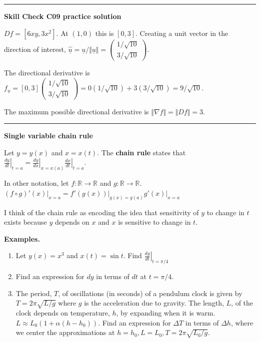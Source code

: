 \documentclass[12pt,letterpaper,noanswers]{exam}
\newcommand{\mb}[1]{\underline{#1}}
\begin{document}
\vspace{0.2cm}
\hrule
\vspace{0.2cm}

\noindent\textbf{Skill Check C09 practice solution}

$Df = [6xy, 3x^2]$.  At $(1,0)$ this is $[0, 3]$.  Creating a unit vector in the direction of interest, $\hat{\mb{u}}=\mb{u}/\Vert\mb{u}\Vert = \left(\begin{array}{c} 1/\sqrt{10} \\ 3/\sqrt{10}\end{array}\right)$.

The directional derivative is $f_{\mb{u}} =[0, 3]\left(\begin{array}{c} 1/\sqrt{10} \\ 3/\sqrt{10}\end{array}\right) = 0(1/\sqrt{10}) + 3(3/\sqrt{10}) = 9/\sqrt{10}$.

The maximum possible directional derivative is $\Vert \nabla f \Vert = \Vert Df \Vert = 3.$

\vspace{0.2cm}
\hrule
\vspace{0.2cm}



\noindent\textbf{Single variable chain rule}
\begin{tcolorbox}
Let $y = y(x)$ and $x = x(t)$.  The \textbf{chain rule} states that $\left.\frac{dy}{dt}\right\vert_{t=a} = \left.\frac{dy}{dx}\right\vert_{x=x(a)}\left.\frac{dx}{dt}\right\vert_{t=a}.$

In other notation, let $f:\mathbb{R}\rightarrow\mathbb{R}$ and $g:\mathbb{R}\rightarrow\mathbb{R}$.  $\left.(f\circ g)'(x)\right\vert_{x=a} = \left.f'(g(x))\right\vert_{g(x)=g(a)}\left.g'(x)\right\vert_{x=a}$
\end{tcolorbox}

I think of the chain rule as 
encoding the idea that sensitivity of $y$ to change in $t$ exists because $y$ depends on $x$ and $x$ is sensitive to change in $t$.

\noindent\textbf{Examples.}
\begin{enumerate}
\item Let $y(x) = x^3$ and $x(t) = \sin t$.  Find $\left.\frac{dy}{dt}\right\vert_{t=\pi/4}$
\vspace{2cm}

\item Find an expression for $dy$ in terms of $dt$ at $t = \pi/4$.
\vspace{1.5cm}

\item The period, $T$, of oscillations (in seconds) of a pendulum clock is given by $T = 2\pi\sqrt{L/g}$ where $g$ is the acceleration due to gravity.  The length, $L$, of the clock depends on temperature, $h$, by expanding when it is warm. $L \approx L_0(1+ \alpha(h-h_0))$.  Find an expression for $\Delta T$ in terms of $\Delta h$, where we center the approximations at $h = h_0, L = L_0, T = 2\pi\sqrt{L_0/g}$.
\vspace{3cm}

\end{enumerate}
\end{document}
